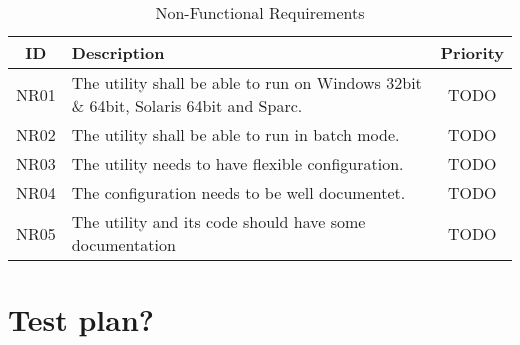 \begin{table}[h] \center
\caption{Non-Functional Requirements\label{tab:nonfuncreq}}
\begin{tabular}{| c | p{9cm} | c |}
	\hline ID & Description & Priority \\
	\hline NR01 & The utility shall be able to run on Windows 32bit \& 64bit,
		Solaris 64bit and Sparc. & TODO \\
	\hline NR02 & The utility shall be able to run in batch mode. & TODO \\
	\hline NR03 & The utility needs to have flexible configuration. & TODO \\
	\hline NR04 & The configuration needs to be well documentet. & TODO \\
	\hline NR05 & The utility and its code should have some documentation
		& TODO \\
	\hline
\end{tabular}
\end{table}

\chapter{Test plan?}

